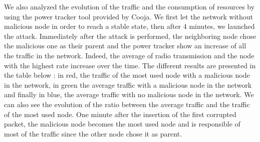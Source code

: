 \documentclass{report}
\begin{document}
We also analyzed the evolution of the traffic and the consumption of
resources by using the power tracker tool provided by Cooja. We first
let the network without malicious node in order to reach a stable state,
then after 4 minutes, we launched the attack. Immediately after the
attack is performed, the neighboring node chose the malicious one as
their parent and the power tracker show an increase of all the traffic
in the network. Indeed, the average of radio transmission and the node
with the highest rate increase over the time. The different results are
presented in the table below : in red, the traffic of the most used node
with a malicious node in the network, in green the average traffic with
a malicious node in the network and finally in blue, the average traffic
with no malicious node in the network. We can also see the evolution of
the ratio between the average traffic and the traffic of the most used
node. One minute after the insertion of the first corrupted packet, the
malicious node becomes the most used node and is responsible of most of
the traffic since the other node chose it as parent. 


\end{document}
